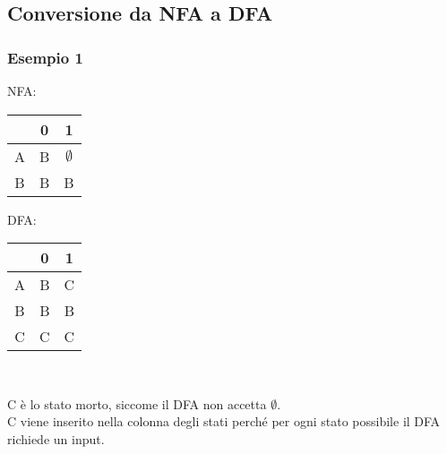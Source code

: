 \documentclass[14pt]{extarticle}
\begin{document}
\subsection{Conversione da NFA a DFA}
\subsubsection{Esempio 1}
NFA:
\begin{center}
    \begin{tabular}{c |c c} 
     & 0 & 1 \\
    \hline
    A & B & $\emptyset$\\
    B & B & B  \\
   \end{tabular}
\end{center}
DFA:
\begin{center}
    \begin{tabular}{c |c c} 
     & 0 & 1 \\
    \hline
    A & B & C\\
    B & B & B  \\
    C & C & C
   \end{tabular}\\
\end{center}
C è lo stato morto, siccome il DFA non accetta $\emptyset$.
\\C viene inserito nella colonna degli stati perché per ogni stato possibile
il DFA richiede un input.
\end{document}
